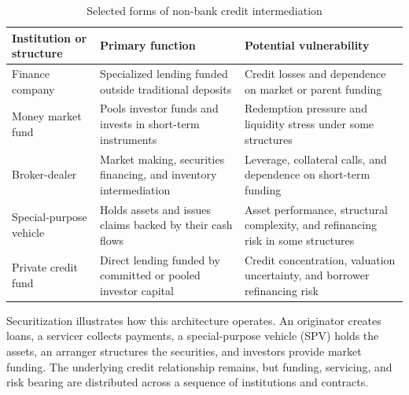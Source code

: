 \begin{table}[H]

\centering

\caption{Selected forms of non-bank credit intermediation}

\label{tab:ch16-shadow-banking-institutions}

\begin{tabularx}{0.94\textwidth}{@{}p{} X X@{}}

\toprule

\textbf{Institution or structure} & \textbf{Primary function} & \textbf{Potential vulnerability} \\

\midrule

Finance company
& Specialized lending funded outside traditional deposits
& Credit losses and dependence on market or parent funding \\

Money market fund
& Pools investor funds and invests in short-term instruments
& Redemption pressure and liquidity stress under some structures \\

Broker-dealer
& Market making, securities financing, and inventory intermediation
& Leverage, collateral calls, and dependence on short-term funding \\

Special-purpose vehicle
& Holds assets and issues claims backed by their cash flows
& Asset performance, structural complexity, and refinancing risk in some structures \\

Private credit fund
& Direct lending funded by committed or pooled investor capital
& Credit concentration, valuation uncertainty, and borrower refinancing risk \\

\bottomrule

\end{tabularx}

\end{table}

Securitization illustrates how this architecture operates. An originator creates loans, a servicer collects payments, a special-purpose vehicle (SPV) holds the assets, an arranger structures the securities, and investors provide market funding. The underlying credit relationship remains, but funding, servicing, and risk bearing are distributed across a sequence of institutions and contracts.

